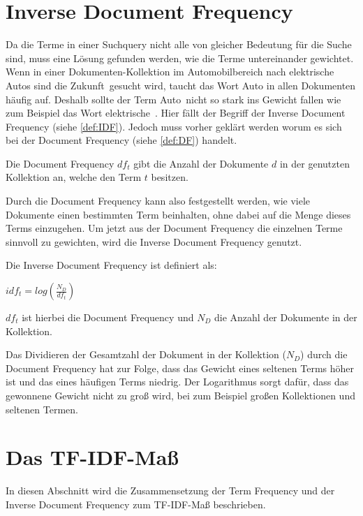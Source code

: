 \section{Inverse Document Frequency}
Da die Terme in einer Suchquery nicht alle von gleicher Bedeutung für die Suche sind, muss eine Lösung gefunden werden, wie die Terme untereinander gewichtet. Wenn in einer Dokumenten-Kollektion im Automobilbereich nach \glqq elektrische Autos sind die Zukunft\grqq\ gesucht wird, taucht das Wort Auto in allen Dokumenten häufig auf. Deshalb sollte der Term \glqq Auto\grqq\ nicht so stark ins Gewicht fallen wie zum Beispiel das Wort \glqq elektrische\grqq\ . Hier fällt der Begriff der Inverse Document Frequency (siehe \cref{def:IDF}). Jedoch muss vorher geklärt werden worum es sich bei der Document Frequency (siehe \cref{def:DF}) handelt.

\begin{defi}\label{def:DF}
	Die Document Frequency $df_t$ gibt die Anzahl der Dokumente $d$ in der genutzten Kollektion an, welche den Term $t$ besitzen.
\end{defi}
\newpage
Durch die Document Frequency kann also festgestellt werden, wie viele Dokumente einen bestimmten Term beinhalten, ohne dabei auf die Menge dieses Terms einzugehen. Um jetzt aus der Document Frequency die einzelnen Terme sinnvoll zu gewichten, wird die Inverse Document Frequency genutzt. 

\begin{defi}\label{def:IDF}
	Die Inverse Document Frequency ist definiert als:
	\begin{center}
		$idf_t = log(\frac{N_D}{df_t})$
	\end{center}
	$df_t$ ist hierbei die Document Frequency und $N_D$ die Anzahl der Dokumente in der Kollektion.
\end{defi}

Das Dividieren der Gesamtzahl der Dokument in der Kollektion ($N_D$) durch die Document Frequency hat zur Folge, dass das Gewicht eines seltenen Terms höher ist und das eines häufigen Terms niedrig. Der Logarithmus sorgt dafür, dass das gewonnene Gewicht nicht zu groß wird, bei zum Beispiel großen Kollektionen und seltenen Termen.

\section{Das TF-IDF-Maß}

In diesen Abschnitt wird die Zusammensetzung der Term Frequency und der Inverse Document Frequency zum TF-IDF-Maß beschrieben. 

